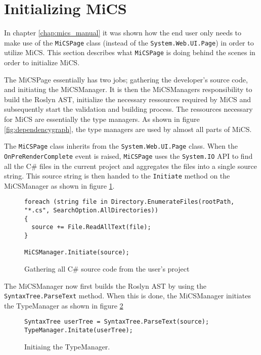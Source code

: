 \section{Initializing MiCS} %
\label{sec:initializing_mics}

In chapter \ref{chap:mics_manual} it was shown how the end user only needs to make use of the \texttt{MiCSPage} class (instead of the \texttt{System.Web.UI.Page}) in order to utilize MiCS. This section describes what \texttt{MiCSPage} is doing behind the scenes in order to initialize MiCS.

The MiCSPage essentially has two jobs; gathering the developer's source code, and initiating the MiCSManager. It is then the MiCSManagers responsibility to build the Roslyn AST, initialize the necessary ressources required by MiCS and subsequently start the validation and building process. The ressources necessary for MiCS are essentially the type managers. As shown in figure \ref{fig:dependencygraph}, the type managers are used by almost all parts of MiCS.

The \texttt{MiCSPage} class inherits from the \texttt{System.Web.UI.Page} class. When the \texttt{OnPreRenderComplete} event is raised, \texttt{MiCSPage} uses the \texttt{System.IO} API to find all the C\# files in the current project and aggregates the files into a single source string. This source string is then handed to the \texttt{Initiate} method on the MiCSManager as shown in figure \ref{fig:init_mics_gather_source_code}.

\begin{figure}[H]
\begin{lstlisting}[language=CSharp,classoffset=1,morekeywords={Directory,SearcOption,File,MiCSManager,ScriptManager}]
foreach (string file in Directory.EnumerateFiles(rootPath, "*.cs", SearchOption.AllDirectories))
{
  source += File.ReadAllText(file);
}

MiCSManager.Initiate(source);
\end{lstlisting}
\caption{Gathering all C\# source code from the user's project}
\label{fig:init_mics_gather_source_code}
\end{figure}

The MiCSManager now first builds the Roslyn AST by using the \newline\texttt{SyntaxTree.ParseText} method. When this is done, the MiCSManager initiates the TypeManager as shown in figure \ref{fig:init_mics_init_typemanager}

\begin{figure}[H]
\begin{lstlisting}[language=CSharp,classoffset=1,morekeywords={TypeManager,SyntaxTree}]
SyntaxTree userTree = SyntaxTree.ParseText(source);
TypeManager.Initate(userTree);
\end{lstlisting}
\caption{Initiaing the TypeManager.}
\label{fig:init_mics_init_typemanager}
\end{figure}

